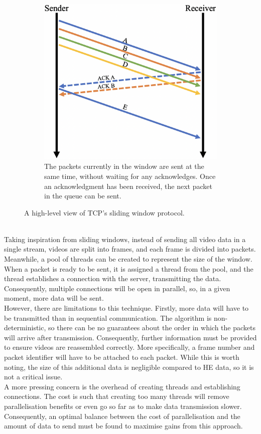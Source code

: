 \begin{figure}[htp]
\begin{subfigure}[b]{0.45\textwidth}
        \includegraphics[scale=0.35]{figures/slidingWindow2}
        \caption{The packets currently in the window are sent at the same time, without waiting for any acknowledges. Once an acknowledgment has been received, the next packet in the queue can be sent.}
    \end{subfigure}%
    \caption[The Sliding Window Protocol]{A high-level view of TCP's sliding window protocol.}
    \label{fig:slidingWindow}
\end{figure}
\smallskip \\ \indent
Taking inspiration from sliding windows, instead of sending all video data in a single stream, videos are split into frames, and each frame is divided into packets. Meanwhile, a pool of threads can be created to represent the size of the window. When a packet is ready to be sent, it is assigned a thread from the pool, and the thread establishes a connection with the server, transmitting the data. Consequently, multiple connections will be open in parallel, so, in a given moment, more data will be sent.
\smallskip \\ \indent
However, there are limitations to this technique. Firstly, more data will have to be transmitted than in sequential communication. The algorithm is non-deterministic, so there can be no guarantees about the order in which the packets will arrive after transmission. Consequently, further information must be provided to ensure videos are reassembled correctly. More specifically, a frame number and packet identifier will have to be attached to each packet. While this is worth noting, the size of this additional data is negligible compared to HE data, so it is not a critical issue.
\smallskip \\ \indent
A more pressing concern is the overhead of creating threads and establishing connections. The cost is such that creating too many threads will remove parallelisation benefits or even go so far as to make data transmission slower. Consequently, an optimal balance between the cost of parallelisation and the amount of data to send must be found to maximise gains from this approach.

